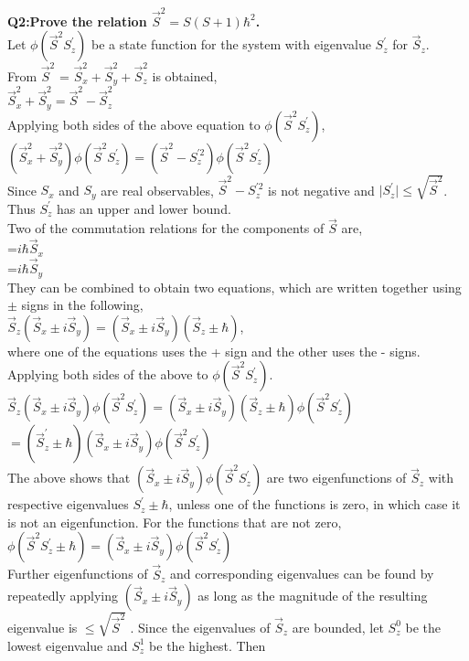 \documentclass{article}
\begin{document}
\newpage
\noindent \textbf{Q2:Prove the relation $\vec{S}^2=S(S+1)\hbar^2$.}\\
\noindent Let $\phi(\vec{S}^2 S^{'}_z)$ be a state function for the system with eigenvalue $S^{'}_z$ for $\vec{S}_z$.\\
\noindent From $\vec{S}^2$ = $\vec{S}^2_x+\vec{S}^2_y+\vec{S}^2_z$ is obtained,\\
\noindent $\vec{S}^2_x+\vec{S}^2_y=\vec{S}^2-\vec{S}^2_z$\\
\noindent Applying both sides of the above equation to $\phi(\vec{S}^2 S^{'}_z)$,\\
\noindent $(\vec{S}^2_x+\vec{S}^2_y)\phi(\vec{S}^2 S^{'}_z)=(\vec{S}^2-S^{'2}_z)\phi(\vec{S}^2 S^{'}_z)$\\
\noindent Since $S_x$ and $S_y$ are real observables, $\vec{S}^2-S^{'2}_z$ is not negative and $\lvert S^{'}_z\rvert\leq\sqrt{\vec{S}^2}$. Thus $S^{'}_z$ has an upper and lower bound.\\
\noindent Two of the commutation relations for the components of $\vec{S}$ are,\\
=${i}\hbar\vec{S}_x$ \\
=${i}\hbar\vec{S}_y$\\
\noindent They can be combined to obtain two equations, which are written together using $\pm$ signs in the following,\\
\noindent $\vec{S}_z(\vec{S}_x\pm i\vec{S}_y)=(\vec{S}_x\pm i\vec{S}_y)(\vec{S}_z\pm \hbar)$,\\
\noindent where one of the equations uses the + sign and the other uses the - signs. Applying both sides of the above to $\phi(\vec{S}^2 S^{'}_z)$.\\
\noindent $\vec{S}_z(\vec{S}_x \pm i\vec{S}_y)\phi(\vec{S}^2 S^{'}_z)=(\vec{S}_x \pm i\vec{S}_y)(\vec{S}_z \pm \hbar)\phi(\vec{S}^2 S^{'}_z)$\\
\noindent $=(\vec{S}^{'}_z \pm \hbar)(\vec{S}_x \pm i\vec{S}_y)\phi(\vec{S}^2 S^{'}_z)$\\
\noindent The above shows that $(\vec{S}_x \pm i\vec{S}_y)\phi(\vec{S}^2 S^{'}_z)$ are two eigenfunctions of $\vec{S}_z$ with respective eigenvalues $S^{'}_z \pm \hbar$, unless one of the functions is zero, in which case it is not an eigenfunction. For the functions that are not zero,\\
\noindent $\phi(\vec{S}^2 S^{'}_z\pm\hbar)=(\vec{S}_x \pm i\vec{S}_y)\phi(\vec{S}^2 S^{'}_z)$\\
\noindent Further eigenfunctions of $\vec{S}_z$ and corresponding eigenvalues can be found by repeatedly applying $(\vec{S}_x \pm i\vec{S}_y)$ as long as the magnitude of the resulting eigenvalue is $\leq\sqrt{\vec{S}^2}$ . Since the eigenvalues of $\vec{S}_z$ are bounded, let $S^{0}_z$ be the lowest eigenvalue and $S^{1}_z$ be the highest. Then\\
\end{document}
